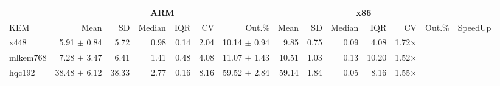 \begin{table}[!ht]
\centering
\begin{tabular}{l|rrrrrr|rrrrrr|r}
\toprule
& \multicolumn{6}{c}{\bfseries ARM} & \multicolumn{6}{c}{\bfseries x86} & \\
\cmidrule(lr){2-7} \cmidrule(lr){8-13}
KEM & Mean & SD & Median & IQR & CV & Out.\% & Mean & SD & Median & IQR & CV & Out.\% & SpeedUp \\
\midrule
x448 			& 5.91     $\pm$ 0.84 & 5.72 & 0.98 & 0.14 & 2.04 & 10.14 $\pm$ 0.94 & 9.85 & 0.75 & 0.09 & 4.08 & 1.72× \\
mlkem768		& 7.28 	  $\pm$ 3.47 & 6.41 & 1.41 & 0.48 & 4.08 & 11.07 $\pm$ 1.43 & 10.51 & 1.03 & 0.13 & 10.20 & 1.52× \\
hqc192 		& 38.48 $\pm$ 6.12 & 38.33 & 2.77 & 0.16 & 8.16 & 59.52 $\pm$ 2.84 & 59.14 & 1.84 & 0.05 & 8.16 & 1.55× \\
\bottomrule
\end{tabular}
\end{table}
